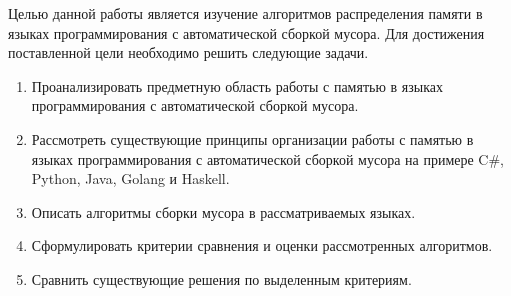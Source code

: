 Целью данной работы является изучение алгоритмов распределения памяти в языках программирования с автоматической сборкой мусора. Для достижения поставленной цели необходимо решить следующие задачи.

\begin{enumerate}[label*=\arabic*.]
	\item Проанализировать предметную область работы с памятью в языках программирования с автоматической сборкой мусора.
	\item Рассмотреть существующие принципы организации работы с памятью в языках программирования с автоматической сборкой мусора на примере C\#, Python, Java, Golang и Haskell.
	\item Описать алгоритмы сборки мусора в рассматриваемых языках.
	\item Сформулировать критерии сравнения и оценки рассмотренных алгоритмов.
	\item Сравнить существующие решения по выделенным критериям. 
\end{enumerate}